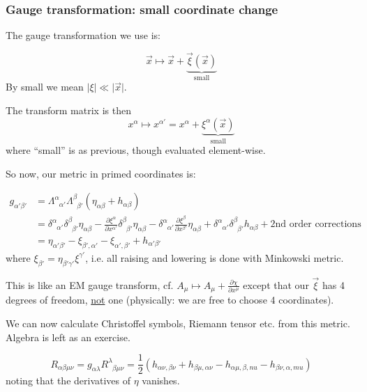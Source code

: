 \documentclass[a4paper]{article} %
\begin{document}
\subsubsection{Gauge transformation: small coordinate change}

The gauge transformation we use is:

\begin{equation}
\vec{x} \mapsto \vec{x} + \underbrace{\vec{\xi}(\vec{x})}_{\text{small}}
\end{equation}
By small we mean $\lvert \xi \rvert \ll \lvert \vec{x} \rvert$.

The transform matrix is then
\begin{equation}
x^{\alpha} \mapsto x^{\alpha'} = x^{\alpha} + \underbrace{\xi^{\alpha}(\vec{x})}_{\text{small}}
\end{equation}
where ``small'' is as previous, though evaluated element-wise.

So now, our metric in primed coordinates is:

\begin{align}
g_{\alpha'\beta'}&=\Lambda^{\alpha}_{\phantom{\alpha}\alpha'} \Lambda^{\beta}_{\phantom{\beta}\beta'}
(\eta_{\alpha\beta}+h_{\alpha\beta})\\
&=\delta^{\alpha}_{\phantom{\alpha}\alpha'}\delta^{\beta}_{\phantom{\beta}\beta'}\eta_{\alpha\beta}
-\frac{\partial \xi^{\alpha}}{\partial x^{\alpha'}} \delta^{\beta}_{\phantom{\beta}\beta'}\eta_{\alpha \beta}
-\delta^{\alpha}_{\phantom{\alpha}\alpha'}\frac{\partial \xi^{\beta}}{\partial x^{\beta'}}\eta_{\alpha\beta}
+\delta^{\alpha}_{\phantom{\alpha}\alpha'}\delta^{\beta}_{\phantom{\beta}\beta'}h_{\alpha\beta}
+\text{2nd order corrections}\\
&=\eta_{\alpha'\beta'}-\xi_{\beta', \alpha'}-\xi_{\alpha', \beta'}+h_{\alpha'\beta'}
\end{align}
where $\xi_{\beta'}=\eta_{\beta'\gamma'}\xi^{\gamma'}$, i.e. all raising and lowering is done with Minkowski metric.

This is like an EM gauge transform, cf. $A_{\mu}\mapsto A_{\mu}+\frac{\partial \chi}{\partial x^{\mu}}$ except that our
$\vec{\xi}$ has 4 degrees of freedom, \underline{not} one (physically: we are free to choose 4 coordinates).

We can now calculate Christoffel symbols, Riemann tensor etc. from this metric. Algebra is left as an exercise.

\begin{equation}
R_{\alpha\beta\mu\nu}=g_{\alpha \lambda} R^{\lambda}_{\phantom{\lambda}\beta\mu\nu}
=\frac{1}{2}\left(h_{\alpha\nu,\beta\nu}+h_{\beta\mu,\alpha\nu}-h_{\alpha\mu,\beta,nu}-h_{\beta\nu,\alpha,mu}\right)
\end{equation}
noting that the derivatives of $\eta$ vanishes.
\end{document}

